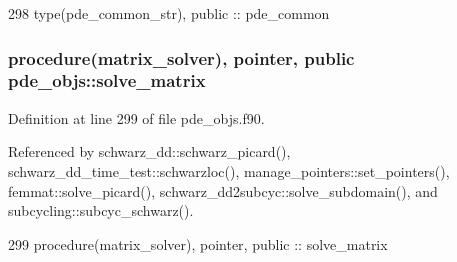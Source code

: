 \begin{DoxyCode}
298   \textcolor{keywordtype}{type}(pde_common_str), \textcolor{keywordtype}{public} :: pde_common
\end{DoxyCode}
\subsubsection[{solve\+\_\+matrix}]{\setlength{\rightskip}{0pt plus 5cm}procedure({\bf matrix\+\_\+solver}), pointer, public pde\+\_\+objs\+::solve\+\_\+matrix}\label{namespacepde__objs_a351dcbad99541c9c3f9b6fd83c9b07c3}


Definition at line 299 of file pde\+\_\+objs.\+f90.



Referenced by schwarz\+\_\+dd\+::schwarz\+\_\+picard(), schwarz\+\_\+dd\+\_\+time\+\_\+test\+::schwarzloc(), manage\+\_\+pointers\+::set\+\_\+pointers(), femmat\+::solve\+\_\+picard(), schwarz\+\_\+dd2subcyc\+::solve\+\_\+subdomain(), and subcycling\+::subcyc\+\_\+schwarz().


\begin{DoxyCode}
299   \textcolor{keywordtype}{procedure}(matrix_solver), \textcolor{keywordtype}{pointer}, \textcolor{keywordtype}{public} :: solve_matrix
\end{DoxyCode}
